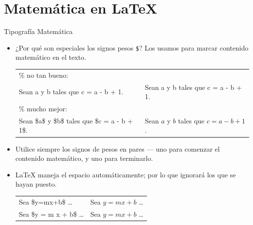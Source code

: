 \documentclass[12pt]{beamer}
\begin{document}
\section{Matemática en \LaTeX}
\begin{frame}{Tipografía Matemática}
   \footnotesize{
     \begin{itemize}
     \item<1-> ¿Por qué son especiales los signos pesos \texttt{\color{blue}\$}? Los usamos para marcar contenido  matemático en el texto.\\[1ex]    
     \begin{tabular}{|p{5cm}|p{5cm}|}\hline
 \color{green}\% no tan bueno: & \\
 Sean a y b tales que c = a - b + 1.&Sean a y b tales que c = a - b + 1.\\
 \color{green}\% mucho mejor: & \\
 Sean \$a\$ y \$b\$ tales que \$c = a - b + 1\$. &
 Sean $a$ y $b$ tales que $c = a - b + 1$.\\\hline
     \end{tabular}
   \item<2-> Utilice siempre los signos de pesos en pares --- uno para comenzar el contenido matemático, y uno para terminarlo.
   \item<3-> \LaTeX{} maneja el espacio automáticamente; por lo que ignorará los que se hayan puesto.\\[1ex]
     \begin{center}    
     \begin{tabular}{|l|l|}\hline
 Sea \$y=mx+b\$ \ldots & Sea $y=mx+b$ \ldots\\[5pt]      
 Sea \$y = m x + b\$ \ldots & Sea $y = m x + b$ \ldots\\\hline
     \end{tabular}
     \end{center}
\end{itemize}
}   
\end{frame}
\end{document}
